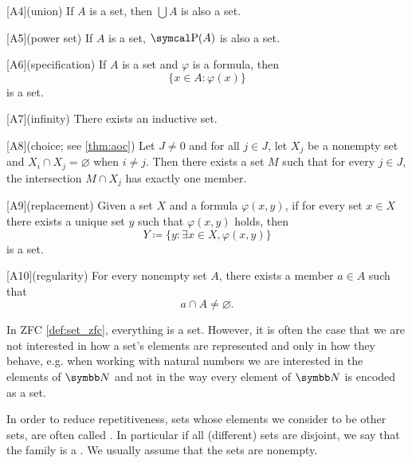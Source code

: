 \begin{definition}
\begin{description}
    [A4](union) If \( A \) is a set, then \( \bigcup A \) is also a set.

    [A5](power set) If \( A \) is a set, \( \Power(A) \) is also a set.

    [A6](specification) If \( A \) is a set and \( \varphi \) is a formula, then
    \begin{equation*}
      \{ x \in A \colon \varphi(x) \}
    \end{equation*}
    is a set.

    [A7](infinity) There exists an inductive set.

    [A8](choice; see \cref{thm:aoc}) Let \( J \neq 0 \) and for all \( j \in J \), let \( X_j \) be a nonempty set and \( X_i \cap X_j = \varnothing \) when \( i \neq j \). Then there exists a set \( M \) such that for every \( j \in J \), the intersection \( M \cap X_j \) has exactly one member.

    [A9](replacement) Given a set \( X \) and a formula \( \varphi(x, y) \), if for every set \( x \in X \) there exists a unique set \( y \) such that \( \varphi(x, y) \) holds, then
    \begin{equation*}
      Y \coloneqq \{ y \colon \exists x \in X, \varphi(x, y) \}
    \end{equation*}
    is a set.

    [A10](regularity) For every nonempty set \( A \), there exists a member \( a \in A \) such that
    \begin{equation*}
      a \cap A \neq \varnothing.
    \end{equation*}
  \end{description}
\end{definition}

\begin{remark}\label{remark:family_of_sets}
  In ZFC \cref{def:set_zfc}, everything is a set. However, it is often the case that we are not interested in how a set's elements are represented and only in how they behave, e.g. when working with natural numbers we are interested in the elements of \( \BN \) and not in the way every element of \( \BN \) is encoded as a set.

  In order to reduce repetitiveness, sets whose elements we consider to be other sets, are often called . In particular if all (different) sets are disjoint, we say that the family is a . We usually assume that the sets are nonempty.
\end{remark}


